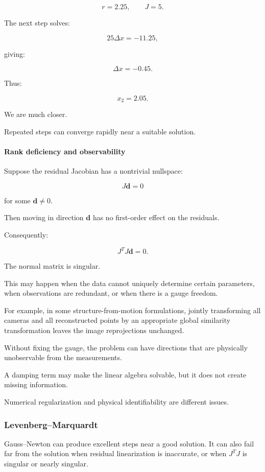 \[
r=2.25,\qquad J=5.
\]

The next step solves:

\[
25\Delta x=-11.25,
\]

giving:

\[
\Delta x=-0.45.
\]

Thus:

\[
x_2=2.05.
\]

We are much closer.

Repeated steps can converge rapidly near a suitable solution.

\paragraph{Rank deficiency and observability}\label{02-foundations-ii-ch027-rank-deficiency-and-observability}

Suppose the residual Jacobian has a nontrivial nullspace:

\[
J\mathbf d=0
\]

for some \(\mathbf d\ne0\).

Then moving in direction \(\mathbf d\) has no first-order effect on the residuals.

Consequently:

\[
J^TJ\mathbf d=0.
\]

The normal matrix is singular.

This may happen when the data cannot uniquely determine certain parameters, when observations are redundant, or when there is a gauge freedom.

For example, in some structure-from-motion formulations, jointly transforming all cameras and all reconstructed points by an appropriate global similarity transformation leaves the image reprojections unchanged.

Without fixing the gauge, the problem can have directions that are physically unobservable from the measurements.

A damping term may make the linear algebra solvable, but it does not create missing information.

Numerical regularization and physical identifiability are different issues.

\subsubsection{Levenberg--Marquardt}\label{02-foundations-ii-ch027-levenbergmarquardt}

Gauss--Newton can produce excellent steps near a good solution. It can also fail far from the solution when residual linearization is inaccurate, or when \(J^TJ\) is singular or nearly singular.

